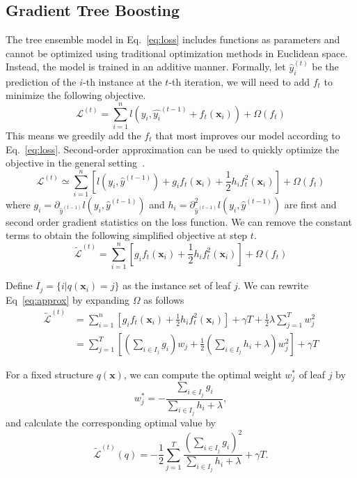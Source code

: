 \documentclass{sig-alternate-05-2015}
\newcommand{\x}{\mathbf{x}}
\begin{document}
\subsection{Gradient Tree Boosting}
The tree ensemble model in Eq.~\eqref{eq:loss} includes functions as parameters  and cannot be optimized using  traditional optimization methods in Euclidean space.
Instead, the model is trained in an additive manner.
Formally, let $\hat{y}_i^{(t)}$ be the prediction of the $i$-th instance at the $t$-th iteration, we will need to add $f_t$ to minimize the following objective.
\begin{equation*}
\mathcal{L}^{(t)} = \sum_{i=1}^n l(y_i,\hat{y_i}^{(t-1)}+f_t(\x_i))+\Omega(f_t)
\end{equation*}
This means we greedily add the $f_t$ that most improves our model according to Eq.~\eqref{eq:loss}.
Second-order approximation can be used to quickly optimize the objective in the general setting~\cite{friedman2000additive}.
\begin{equation*}
\mathcal{L}^{(t)} \simeq \sum_{i=1}^n [l(y_i,\hat{y}^{(t-1)}) + g_i f_t(\x_i)+\frac{1}{2}h_i f_t^2(\x_i)] + \Omega(f_t)
\end{equation*}
where $g_i = \partial_{\hat{y}^{(t-1)}}l(y_i,\hat{y}^{(t-1)})$ and $h_i = \partial^2_{\hat{y}^{(t-1)}}l(y_i,\hat{y}^{(t-1)})$
are first and second order gradient statistics on the loss function.
We can remove the constant terms to obtain the following simplified objective at step $t$.
\begin{equation}\label{eq:approx}
\tilde{\mathcal{L}}^{(t)} = \sum_{i=1}^n [g_i f_t(\x_i)+\frac{1}{2}h_i f_t^2(\x_i)] + \Omega(f_t)
\end{equation}

Define $I_j=\{i|q(\x_i)=j\}$ as the instance set of leaf $j$.
We can rewrite Eq~\eqref{eq:approx} by expanding $\Omega$ as follows
\begin{equation}
\begin{split}
\tilde{\mathcal{L}}^{(t)}
         &=\sum^n_{i=1} [g_i f_t(\x_i)+\frac{1}{2}h_if_t^2(\x_i)]+\gamma T + \frac{1}{2}\lambda\sum^T_{j=1}w_j^2\\
         &=\sum^T_{j=1}[(\sum_{i\in I_j} g_i)w_j+\frac{1}{2}(\sum_{i\in I_j} h_i+\lambda)w_j^2]+\gamma T
\end{split}
\end{equation}

For a fixed structure $q(\x)$, we can compute the optimal weight $w_j^*$ of leaf $j$ by
\begin{equation}\label{eq:leafscore}
w^*_j =-\frac{\sum_{i\in I_j} g_i}{\sum_{i\in I_j} h_i+\lambda},
\end{equation}
and calculate the corresponding optimal  value by
\begin{equation}\label{eq:score}
\tilde{\mathcal{L}}^{(t)}(q) = - \frac{1}{2} \sum^T_{j=1}\frac{(\sum_{i\in I_j} g_i)^2}{\sum_{i\in I_j} h_i + \lambda}+\gamma T.
\end{equation}
\end{document}
